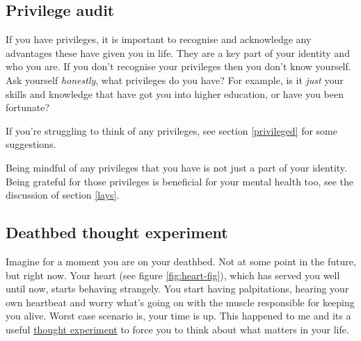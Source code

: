 \documentclass[
]{book}
\begin{document}
\hypertarget{apriv}{%
\subsection{Privilege audit}\label{apriv}}

If you have privileges, it is important to recognise and acknowledge any advantages these have given you in life. They are a key part of your identity and who you are. If you don't recognise your privileges then you don't know yourself. Ask yourself \emph{honestly}, what privileges do you have? For example, is it \emph{just} your skills and knowledge that have got you into higher education, or have you been fortunate?

If you're struggling to think of any privileges, see section \ref{privileged} for some suggestions.

Being mindful of any privileges that you have is not just a part of your identity. Being grateful for those privileges is beneficial for your mental health too, see the discussion of section \ref{lays}.

\hypertarget{regrets}{%
\subsection{Deathbed thought experiment}\label{regrets}}

Imagine for a moment you are on your deathbed. Not at some point in the future, but right now. Your heart (see figure \ref{fig:heart-fig}), which has served you well until now, starts behaving strangely. You start having palpitations, hearing your own heartbeat \citep{elektrokardiogramm} and worry what's going on with the muscle responsible for keeping you alive. Worst case scenario is, your time is up. This happened to me and its a useful \href{https://en.wikipedia.org/wiki/Thought_experiment}{thought experiment} to force you to think about what matters in your life. \citep{deathbed}
\end{document}
